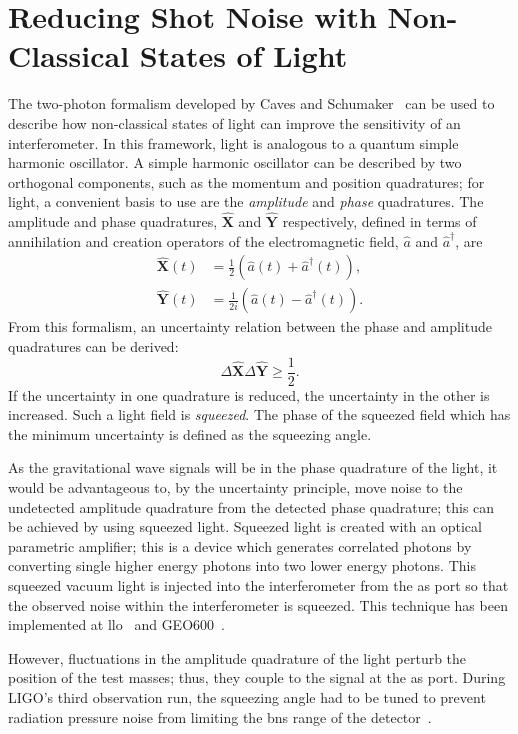 \section{Reducing Shot Noise with Non-Classical States of Light}
\label{sec:detector_chapter_two_photon_formalism}
The two-photon formalism developed by Caves and Schumaker~\cite{Caves1985,Schumaker1985} can be used to describe how non-classical states of light can improve the sensitivity of an interferometer. In this framework, light is analogous to a quantum simple harmonic oscillator. A simple harmonic oscillator can be described by two orthogonal components, such as the momentum and position quadratures; for light, a convenient basis to use are the \emph{amplitude} and \emph{phase} quadratures. The amplitude and phase quadratures, $ \mathbf{\hat{X}}$ and $\mathbf{\hat{Y}}$ respectively, defined in terms of annihilation and creation operators of the electromagnetic field, $\hat{a}$ and $\hat{a}^\dagger$, are
\begin{align}
\mathbf{\hat{X}}(t) &= \frac{1}{2}\left(\hat{a}(t) + \hat{a}^\dagger(t)\right),\\
\mathbf{\hat{Y}}(t) &= \frac{1}{2i}\left(\hat{a}(t) - \hat{a}^\dagger(t)\right).
\end{align}
From this formalism, an uncertainty relation between the phase and amplitude quadratures can be derived:
\begin{equation}
\Delta\mathbf{\hat{X}}\Delta\mathbf{\hat{Y}}\geq \frac{1}{2}.
\end{equation}
If the uncertainty in one quadrature is reduced, the uncertainty in the other is increased. Such a light field is \emph{squeezed}. The phase of the squeezed field which has the minimum uncertainty is defined as the squeezing angle.
\par
As the gravitational wave signals will be in the phase quadrature of the light, it would be advantageous to, by the uncertainty principle, move noise to the undetected amplitude quadrature from the detected phase quadrature; this can be achieved by using squeezed light. Squeezed light is created with an optical parametric amplifier; this is a device which generates correlated photons by converting single higher energy photons into two lower energy photons. This squeezed vacuum light is injected into the interferometer from the \gls{as} port so that the observed noise within the interferometer is squeezed. This technique has been implemented at \gls{llo}~\cite{Tse2019} and GEO600~\cite{Lough2020}.
\par
However, fluctuations in the amplitude quadrature of the light perturb the position of the test masses; thus, they couple to the signal at the \gls{as} port. During LIGO's third observation run, the squeezing angle had to be tuned to prevent radiation pressure noise from limiting the \gls{bns} range of the detector~\cite{Tse2019}. 
